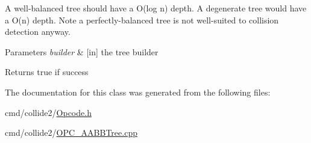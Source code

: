 A well-\/balanced tree should have a O(log n) depth. A degenerate tree would have a O(n) depth. Note a perfectly-\/balanced tree is not well-\/suited to collision detection anyway.


\begin{DoxyParams}{Parameters}
{\em builder} & \mbox{[}in\mbox{]} the tree builder \\
\hline
\end{DoxyParams}
\begin{DoxyReturn}{Returns}
true if success 
\end{DoxyReturn}


The documentation for this class was generated from the following files\+:\begin{DoxyCompactItemize}
\item 
cmd/collide2/\hyperlink{Opcode_8h}{Opcode.\+h}\item 
cmd/collide2/\hyperlink{OPC__AABBTree_8cpp}{O\+P\+C\+\_\+\+A\+A\+B\+B\+Tree.\+cpp}\end{DoxyCompactItemize}
